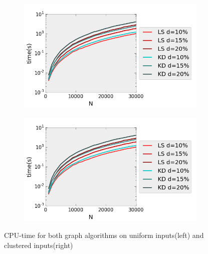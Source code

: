 \begin{figure}[H] 
  \begin{subfigure}[b]{0.5\linewidth}
    \centering
    \includegraphics[width=0.9\linewidth]{Pictures/unif_kd_ls_t} 
    \label{fig:unif_kd_ls_t} 
    \vspace{4ex}
  \end{subfigure}%
  \begin{subfigure}[b]{0.5\linewidth}
    \centering
    \includegraphics[width=0.9\linewidth]{Pictures/unif_kd_ls_t} 
    \label{fig:clus_kd_ls_t} 
    \vspace{4ex}
  \end{subfigure}
  \caption{CPU-time for both graph algorithms on uniform inputs(left) and clustered inputs(right)}
  \label{fig:kd_ls_t} 
\end{figure}


